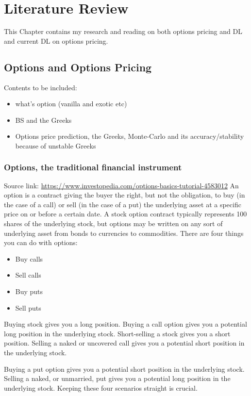 \documentclass{report}
\begin{document}
\chapter{Literature Review}

This Chapter contains my research and reading on both options pricing and DL and current DL on options pricing.

\section{Options and Options Pricing}

Contents to be included:
\begin{itemize}
\item what's option (vanilla and exotic etc)
\item BS and the Greeks
\item Options price prediction, the Greeks, Monte-Carlo and its accuracy/stability because of unstable Greeks
\end{itemize}


\subsection{Options, the traditional financial instrument}
Source link: \url {https://www.investopedia.com/options-basics-tutorial-4583012}\newline
An option is a contract giving the buyer the right, but not the obligation, to buy (in the case of a call) or sell (in the case of a put) the underlying asset at a specific price on or before a certain date.
A stock option contract typically represents 100 shares of the underlying stock, but options may be written on any sort of underlying asset from bonds to currencies to commodities.
There are four things you can do with options:
\begin{itemize}
\item Buy calls
\item Sell calls
\item Buy puts
\item Sell puts
\end{itemize}
Buying stock gives you a long position. Buying a call option gives you a potential long position in the underlying stock. Short-selling a stock gives you a short position. Selling a naked or uncovered call gives you a potential short position in the underlying stock.

Buying a put option gives you a potential short position in the underlying stock. Selling a naked, or unmarried, put gives you a potential long position in the underlying stock. Keeping these four scenarios straight is crucial.
\end{document}
